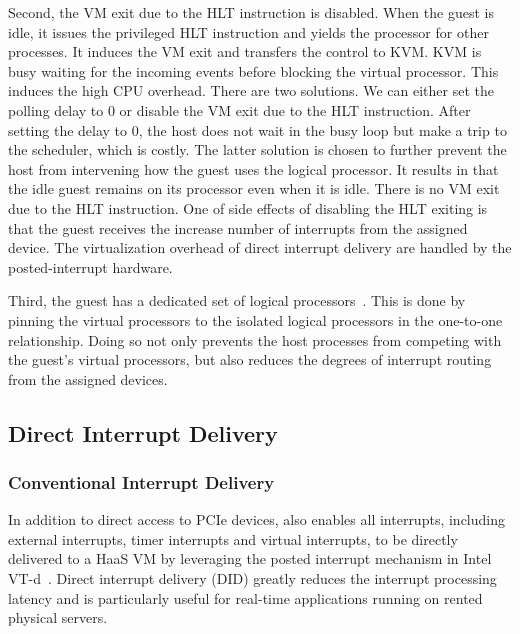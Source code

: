 {Second, the VM exit due to the HLT instruction is disabled.
When the guest is idle, it issues the privileged HLT
instruction and yields the processor for other processes. It
induces the VM exit and transfers the control to KVM. KVM is
busy waiting for the incoming events before blocking the
virtual processor. This induces the high CPU overhead. There
are two solutions. We can either set the polling delay to 0 or
disable the VM exit due to the HLT instruction. After setting
the delay to 0, the host does not wait in the busy loop but
make a trip to the scheduler, which is costly. The latter
solution is chosen to further prevent the host from
intervening how the guest uses the logical processor. It
results in that the idle guest remains on its processor even
when it is idle. There is no VM exit due to the HLT
instruction. One of side effects of disabling the HLT exiting
is that the guest receives the increase number of interrupts
from the assigned device. The virtualization overhead of
direct interrupt delivery are handled by the posted-interrupt
hardware.

Third, the guest has a dedicated set of logical
processors~\cite{amit:2015}. This is done by pinning the
virtual processors to the isolated logical processors in the
one-to-one relationship. Doing so not only prevents the host
processes from competing with the guest's virtual processors,
but also reduces the degrees of interrupt routing from the
assigned devices.
}


\subsection{Direct Interrupt Delivery}

\subsubsection{Conventional Interrupt Delivery}

In addition to direct access to PCIe devices,
\na also enables all interrupts, including external interrupts, timer interrupts and 
virtual interrupts, to be directly delivered to a HaaS VM by leveraging
the posted interrupt mechanism in Intel VT-d~\cite{postedinterrupt}.
Direct interrupt delivery (DID) greatly reduces the interrupt processing latency and is
particularly useful for real-time applications running on rented physical servers. 


